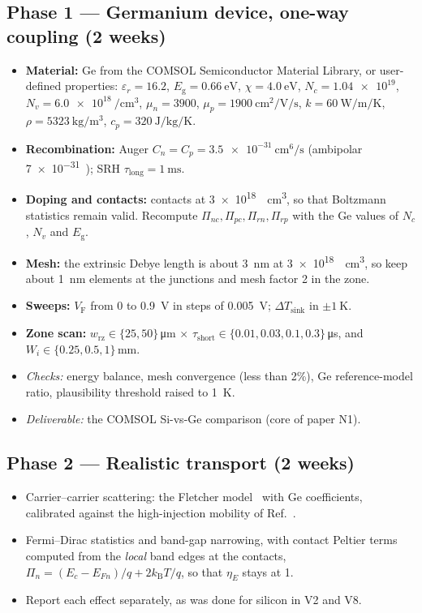 \documentclass[11pt,a4paper]{article}
\newcommand{\kB}{k_{\mathrm{B}}}
\newcommand{\Eg}{E_{\mathrm{g}}}
\newcommand{\VF}{V_{\mathrm{F}}}
\begin{document}
\subsection*{Phase 1 --- Germanium device, one-way coupling (2 weeks)}
\begin{itemize}
  \item \textbf{Material:} Ge from the COMSOL Semiconductor Material Library, or user-defined properties: $\varepsilon_r=16.2$, $\Eg=\SI{0.66}{\electronvolt}$, $\chi=\SI{4.0}{\electronvolt}$, $N_c=\num{1.04e19}$, $N_v=\SI{6.0e18}{\per\centi\metre\cubed}$, $\mu_n=3900$, $\mu_p=\SI{1900}{\centi\metre\squared\per\volt\per\second}$, $k=\SI{60}{\watt\per\metre\per\kelvin}$, $\rho=\SI{5323}{\kilogram\per\metre\cubed}$, $c_p=\SI{320}{\joule\per\kilogram\per\kelvin}$.
  \item \textbf{Recombination:} Auger $C_n=C_p=\SI{3.5e-31}{\centi\metre\tothe{6}\per\second}$ (ambipolar \num{7e-31}~\cite{garin2026}); SRH $\tau_{\mathrm{long}}=\SI{1}{\milli\second}$.
  \item \textbf{Doping and contacts:} contacts at \SI{3e18}{\per\centi\metre\cubed}, so that Boltzmann statistics remain valid. Recompute $\Pi_{nc},\Pi_{pc},\Pi_{rn},\Pi_{rp}$ with the Ge values of $N_c$, $N_v$ and $\Eg$.
  \item \textbf{Mesh:} the extrinsic Debye length is about \SI{3}{\nano\metre} at \SI{3e18}{\per\centi\metre\cubed}, so keep about \SI{1}{\nano\metre} elements at the junctions and mesh factor 2 in the zone.
  \item \textbf{Sweeps:} $\VF$ from 0 to \SI{0.9}{\volt} in steps of \SI{0.005}{\volt}; $\Delta T_{\mathrm{sink}}$ in $\pm\SI{1}{\kelvin}$.
  \item \textbf{Zone scan:} $w_{\mathrm{rz}}\in\{25,50\}$\,\si{\micro\metre} $\times$ $\tau_{\mathrm{short}}\in\{0.01,0.03,0.1,0.3\}$\,\si{\micro\second}, and $W_i\in\{0.25,0.5,1\}$\,\si{\milli\metre}.
  \item \emph{Checks:} energy balance, mesh convergence (less than 2\%), Ge reference-model ratio, plausibility threshold raised to \SI{1}{\kelvin}.
  \item \emph{Deliverable:} the COMSOL Si-vs-Ge comparison (core of paper N1).
\end{itemize}

\subsection*{Phase 2 --- Realistic transport (2 weeks)}
\begin{itemize}
  \item Carrier--carrier scattering: the Fletcher model~\cite{fletcher} with Ge coefficients, calibrated against the high-injection mobility of Ref.~\cite{garin2026}.
  \item Fermi--Dirac statistics and band-gap narrowing, with contact Peltier terms computed from the \emph{local} band edges at the contacts, $\Pi_n=(E_c-E_{Fn})/q+2\kB T/q$, so that $\eta_E$ stays at 1.
  \item Report each effect separately, as was done for silicon in V2 and V8.
\end{itemize}
\end{document}

